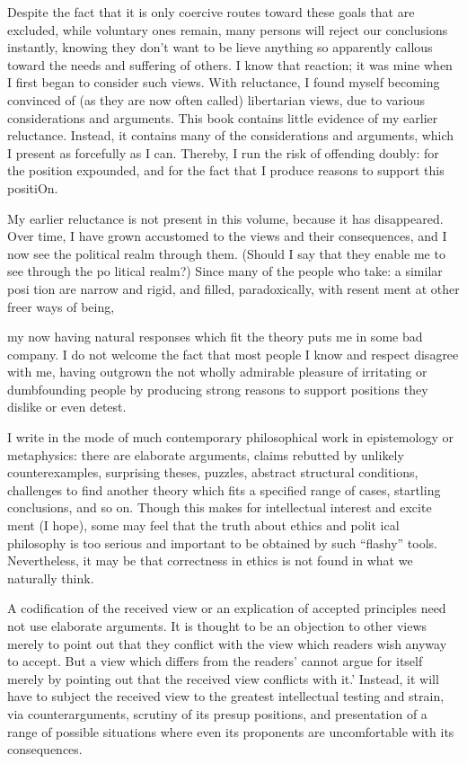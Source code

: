 \documentclass[11pt,openany]{book}
\begin{document}
Despite the fact that it is only coercive routes toward these goals that are excluded, while voluntary ones remain, many persons will reject our conclusions instantly, knowing they don't want to be lieve anything so apparently callous toward the needs and suffering of others. I know that reaction; it was mine when I first began to consider such views. With reluctance, I found myself becoming convinced of (as they are now often called) libertarian views, due to various considerations and arguments. This book contains little evidence of my earlier reluctance. Instead, it contains many of the considerations and arguments, which I present as forcefully as I can. Thereby, I run the risk of offending doubly: for the position expounded, and for the fact that I produce reasons to support this positiOn. 

My earlier reluctance is not present in this volume, because it has disappeared. Over time, I have grown accustomed to the views and their consequences, and I now see the political realm through them. (Should I say that they enable me to see through the po litical realm?) Since many of the people who take: a similar posi tion are narrow and rigid, and filled, paradoxically, with resent ment at other freer ways of being, 

my now having natural responses which fit the theory puts me in some bad company. I do not welcome the fact that most people I know and respect disagree with me, having outgrown the not wholly admirable pleasure of irritating or dumbfounding people by producing strong reasons to support positions they dislike or even detest. 

I write in the mode of much contemporary philosophical work in epistemology or metaphysics: there are elaborate arguments, claims rebutted by unlikely counterexamples, surprising theses, puzzles, abstract structural conditions, challenges to find another theory which fits a specified range of cases, startling conclusions, and so on. Though this makes for intellectual interest and excite ment (I hope), some may feel that the truth about ethics and polit ical philosophy is too serious and important to be obtained by such ``flashy'' tools. Nevertheless, it may be that correctness in ethics is not found in what we naturally think. 

A codification of the received view or an explication of accepted principles need not use elaborate arguments. It is thought to be an objection to other views merely to point out that they conflict with the view which readers wish anyway to accept. But a view which differs from the readers' cannot argue for itself merely by pointing out that the received view conflicts with it.' Instead, it will have to subject the received view to the greatest intellectual testing and strain, via counterarguments, scrutiny of its presup positions, and presentation of a range of possible situations where even its proponents are uncomfortable with its consequences. 
\end{document}
